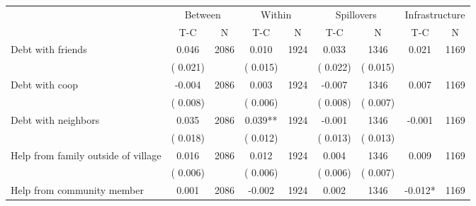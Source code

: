 
\begin{tabular}{l*{8}{c}}\hline&\multicolumn{2}{c}{Between}&\multicolumn{2}{c}{Within}&\multicolumn{2}{c}{Spillovers}&\multicolumn{2}{c}{Infrastructure}\\ \cmidrule(r){2-3}\cmidrule(l){4-5}\cmidrule(l){6-7}\cmidrule(l){8-9} & {T-C} & {N} & {T-C} & {N}  & {T-C}  & {N} & {T-C}  & {N} \\ \midrule
Debt with friends        &              0.046      &       2086       &              0.010      &       1924       &              0.033      &       1346  &        0.021 &       1169       \\
                       &       (       0.021)            &                               &       (       0.015)            &                               &       (       0.022)            &       (       0.015) &                  \\
Debt with coop        &             -0.004      &       2086       &              0.003      &       1924       &             -0.007      &       1346  &        0.007 &       1169       \\
                       &       (       0.008)            &                               &       (       0.006)            &                               &       (       0.008)            &       (       0.007) &                  \\
Debt with neighbors        &              0.035      &       2086       &              0.039**      &       1924       &             -0.001      &       1346  &       -0.001 &       1169       \\
                       &       (       0.018)            &                               &       (       0.012)            &                               &       (       0.013)            &       (       0.013) &                  \\
Help from family outside of village        &              0.016      &       2086       &              0.012      &       1924       &              0.004      &       1346  &        0.009 &       1169       \\
                       &       (       0.006)            &                               &       (       0.006)            &                               &       (       0.006)            &       (       0.007) &                  \\
Help from community member        &              0.001      &       2086       &             -0.002      &       1924       &              0.002      &       1346  &       -0.012* &       1169       \\

\end{tabular}
